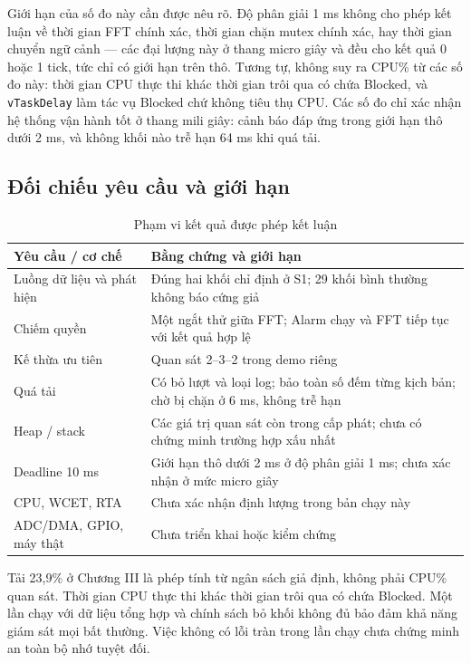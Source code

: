 \documentclass[12pt,a4paper,oneside]{report}
\begin{document}
Giới hạn của số đo này cần được nêu rõ. Độ phân giải 1 ms không cho phép kết luận về thời gian FFT chính xác, thời gian chặn mutex chính xác, hay thời gian chuyển ngữ cảnh — các đại lượng này ở thang micro giây và đều cho kết quả 0 hoặc 1 tick, tức chỉ có giới hạn trên thô. Tương tự, không suy ra CPU\% từ các số đo này: thời gian CPU thực thi khác thời gian trôi qua có chứa Blocked, và \texttt{vTaskDelay} làm tác vụ Blocked chứ không tiêu thụ CPU. Các số đo chỉ xác nhận hệ thống vận hành tốt ở thang mili giây: cảnh báo đáp ứng trong giới hạn thô dưới 2 ms, và không khối nào trễ hạn 64 ms khi quá tải.

\subsection{Đối chiếu yêu cầu và giới hạn}
\begin{table}[H]\centering\small
\caption{Phạm vi kết quả được phép kết luận}\label{tab:ch4-scope}
\begin{tabularx}{\textwidth}{@{}p{4.4cm}X@{}}\toprule
Yêu cầu / cơ chế & Bằng chứng và giới hạn \\\midrule
Luồng dữ liệu và phát hiện & Đúng hai khối chỉ định ở S1; 29 khối bình thường không báo cứng giả \\
Chiếm quyền & Một ngắt thử giữa FFT; Alarm chạy và FFT tiếp tục với kết quả hợp lệ \\
Kế thừa ưu tiên & Quan sát 2--3--2 trong demo riêng \\
Quá tải & Có bỏ lượt và loại log; bảo toàn số đếm từng kịch bản; chờ bị chặn ở 6 ms, không trễ hạn \\
Heap / stack & Các giá trị quan sát còn trong cấp phát; chưa có chứng minh trường hợp xấu nhất \\
Deadline 10 ms & Giới hạn thô dưới 2 ms ở độ phân giải 1 ms; chưa xác nhận ở mức micro giây \\
CPU, WCET, RTA & Chưa xác nhận định lượng trong bản chạy này \\
ADC/DMA, GPIO, máy thật & Chưa triển khai hoặc kiểm chứng \\
\bottomrule\end{tabularx}\end{table}
Tải 23,9\% ở Chương III là phép tính từ ngân sách giả định, không phải CPU\% quan sát. Thời gian CPU thực thi khác thời gian trôi qua có chứa Blocked. Một lần chạy với dữ liệu tổng hợp và chính sách bỏ khối không đủ bảo đảm khả năng giám sát mọi bất thường. Việc không có lỗi tràn trong lần chạy chưa chứng minh an toàn bộ nhớ tuyệt đối.
\end{document}
